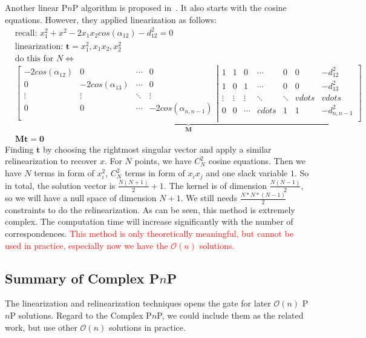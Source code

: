 \documentclass[a4paper]{article}
\begin{document}
Another linear P$n$P algorithm is proposed in~\cite{ansar2003linear}. It also starts with the cosine equations. However, they applied linearization as follows:
\begin{align*}
&\text{recall: } x_1^2+x^2-2x_1x_2cos(\alpha_{12})-d_{12}^2=0 \\
&\text{linearization: $\mathbf{t}={x_1^2, x_1x_2, x_2^2}$} \\
&\text{do this for $N$} \Leftrightarrow \\
&\underbrace{
\left[
\begin{matrix}
-2cos(\alpha_{12}) & 0 & \cdots & 0 \\
0 & -2cos(\alpha_{13}) & \cdots & 0 \\
\vdots & \vdots & \ddots & \vdots \\
0 & 0 & \cdots & -2cos(\alpha_{n, n-1})\\
\end{matrix}
\right.
\left|
\begin{matrix}
1 & 1 & 0 & \cdots & 0 & 0 & -d_{12}^2\\
1 & 0 & 1 & \cdots & 0 & 0 & -d_{13}^2\\
\vdots & \vdots & \vdots& \ddots & \ddots & vdots & vdots \\
0 & 0 & \cdots & cdots & 1 & 1 & -d_{n, n-1}^2\\
\end{matrix}
\right]
}_{\mathbf{M}} \\
&\mathbf{M}\mathbf{t} = \mathbf{0}
\end{align*}
Finding $\mathbf{t}$ by choosing the rightmost singular vector and apply a similar relinearization to recover $x$. For $N$ points, we have $C_{N}^2$ cosine equations. Then we have $N$ terms in form of $x_i^2$, $C_{N}^2$ terms in form of $x_ix_j$ and one slack variable $1$. So in total, the solution vector is $\frac{N(N+1)}{2}+1$. The kernel is of dimension $\frac{N(N-1)}{2}$, so we will have a null space of dimension $N+1$. We still needs $\frac{N*N*(N-1)}{2}$ constraints to do the relinearization. As can be seen, this method is extremely complex. The computation time will increase significantly with the number of correspondences. \textcolor{red}{This method is only theoretically meaningful, but cannot be used in practice, especially now we have the $\mathcal{O}(n)$ solutions.}

\subsection{Summary of Complex P$n$P}
The linearization and relinearization techniques opens the gate for later $\mathcal{O}(n)$ P$n$P solutions. Regard to the Complex P$n$P, we could include them as the related work, but use other $\mathcal{O}(n)$ solutions in practice.
\end{document}
